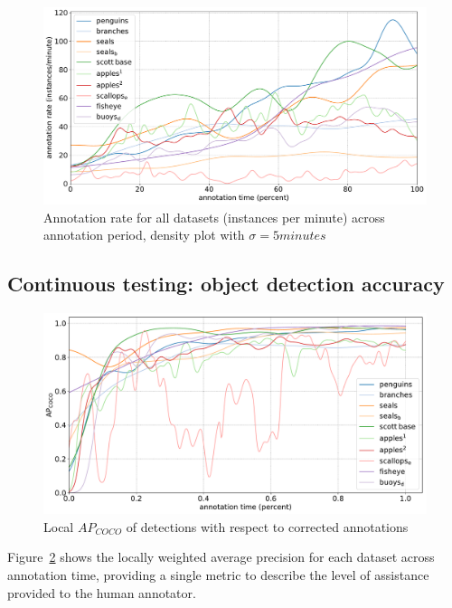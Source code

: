 \begin{figure}[H]
\centering
\includegraphics[width=1.0\linewidth]{charts/summaries/instance_rates.pdf}
\caption{ Annotation rate for all datasets (instances per minute) across annotation period, density plot with $\sigma=5minutes$ }
\label{fig:annotation_rate}
\end{figure}




\subsection{Continuous testing: object detection accuracy}
\label{sec:continuous_testing}

\begin{figure}[H]
\centering
\includegraphics[width=1.0\linewidth]{charts/running_maps/overall.pdf}
\caption{ Local $AP_{COCO}$ of detections with respect to corrected annotations }
\label{fig:average_precision_test}
\end{figure}

Figure~\ref{fig:average_precision_test} shows the locally weighted average precision for each dataset across annotation time, providing a single metric to describe the level of assistance provided to the human annotator. 

